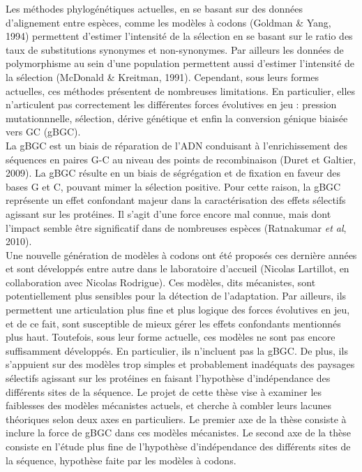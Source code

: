Les méthodes phylogénétiques actuelles, en se basant sur des données d'alignement entre espèces, comme les modèles à codons (Goldman \& Yang, 1994) permettent d'estimer l'intensité de la sélection en se basant sur le ratio des taux de substitutions synonymes et non-synonymes.
Par ailleurs les données de polymorphisme au sein d'une population permettent aussi d'estimer l'intensité de la sélection (McDonald \& Kreitman, 1991).
Cependant, sous leurs formes actuelles, ces méthodes présentent de nombreuses limitations.
En particulier, elles n'articulent pas correctement les différentes forces évolutives en jeu : pression mutationnnelle, sélection, dérive génétique et enfin la conversion génique biaisée vers GC (gBGC).\\

La gBGC est un biais de réparation de l'ADN conduisant à l'enrichissement des séquences en paires G-C au niveau des points de recombinaison (Duret et Galtier, 2009).
La gBGC résulte en un biais de ségrégation et de fixation en faveur des bases G et C, pouvant mimer la sélection positive.
Pour cette raison, la gBGC représente un effet confondant majeur dans la caractérisation des effets sélectifs agissant sur les protéines.
Il s'agit d'une force encore mal connue, mais dont l’impact semble être significatif dans de nombreuses espèces (Ratnakumar\textit{ et al}, 2010). \\

Une nouvelle génération de modèles à codons ont été proposés ces dernière années et sont développés entre autre dans le laboratoire d'accueil (Nicolas Lartillot, en collaboration avec Nicolas Rodrigue).
Ces modèles, dits mécanistes, sont potentiellement plus sensibles pour la détection de l'adaptation.
Par ailleurs, ils permettent une articulation plus fine et plus logique des forces évolutives en jeu, et de ce fait, sont susceptible de mieux gérer les effets confondants mentionnés plus haut.
Toutefois, sous leur forme actuelle, ces modèles ne sont pas encore suffisamment développés.
En particulier, ils n'incluent pas la gBGC.
De plus, ils s’appuient sur des modèles trop simples et probablement inadéquats des paysages sélectifs agissant sur les protéines en faisant l'hypothèse d’indépendance des différents sites de la séquence.
Le projet de cette thèse vise à examiner les faiblesses des modèles mécanistes actuels, et cherche à combler leurs lacunes théoriques selon deux axes en particuliers.
Le premier axe de la thèse consiste à inclure la force de gBGC dans ces modèles mécanistes.
Le second axe de la thèse consiste en l'étude plus fine de l’hypothèse d’indépendance des différents sites de la séquence, hypothèse faite par les modèles à codons.


